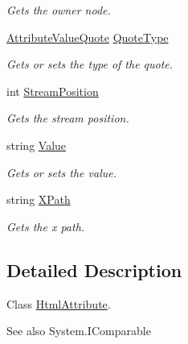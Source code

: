 \begin{DoxyCompactItemize}
\begin{DoxyCompactList}\small\item\em Gets the owner node. \end{DoxyCompactList}\item 
\hyperlink{namespace_html_agility_pack_a64d9f2b9c91f0f73e761936646ebcc57}{Attribute\+Value\+Quote} \hyperlink{class_html_agility_pack_1_1_html_attribute_a3aa9d330f0215348b4d4773f8333a64b}{Quote\+Type}
\begin{DoxyCompactList}\small\item\em Gets or sets the type of the quote. \end{DoxyCompactList}\item 
int \hyperlink{class_html_agility_pack_1_1_html_attribute_a5f9c558a2ec9bba01ec5ae053bdae95b}{Stream\+Position}
\begin{DoxyCompactList}\small\item\em Gets the stream position. \end{DoxyCompactList}\item 
string \hyperlink{class_html_agility_pack_1_1_html_attribute_a48492beba1e60d7e756493d2b4a507c5}{Value}
\begin{DoxyCompactList}\small\item\em Gets or sets the value. \end{DoxyCompactList}\item 
string \hyperlink{class_html_agility_pack_1_1_html_attribute_aba426abd7fa5b54ba4703ee570ab1479}{X\+Path}
\begin{DoxyCompactList}\small\item\em Gets the x path. \end{DoxyCompactList}\end{DoxyCompactItemize}


\subsection{Detailed Description}
Class \hyperlink{class_html_agility_pack_1_1_html_attribute}{Html\+Attribute}. 

\begin{DoxySeeAlso}{See also}
System.\+I\+Comparable


\end{DoxySeeAlso}


